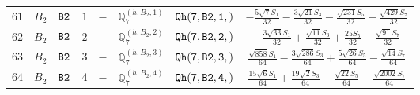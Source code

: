 \documentclass[fleqn,8pt]{jsarticle}
\begin{document}
\begin{table}[ht!]
\begin{center}
\begin{tabular}{cccccccc}
$ 61 $ & $ B_{2} $ & $ {\tt B2} $ & $ 1 $ & $ - $ & $ \mathbb{Q}_{7}^{(h,B_{2},1)} $ & $ {\tt Qh(7,B2,1,)} $ & $ - \frac{5 \sqrt{7} S_{1}}{32} - \frac{3 \sqrt{21} S_{3}}{32} - \frac{\sqrt{231} S_{5}}{32} - \frac{\sqrt{429} S_{7}}{32} $ \\
$ 62 $ & $ B_{2} $ & $ {\tt B2} $ & $ 2 $ & $ - $ & $ \mathbb{Q}_{7}^{(h,B_{2},2)} $ & $ {\tt Qh(7,B2,2,)} $ & $ - \frac{3 \sqrt{33} S_{1}}{32} + \frac{\sqrt{11} S_{3}}{32} + \frac{25 S_{5}}{32} - \frac{\sqrt{91} S_{7}}{32} $ \\
$ 63 $ & $ B_{2} $ & $ {\tt B2} $ & $ 3 $ & $ - $ & $ \mathbb{Q}_{7}^{(h,B_{2},3)} $ & $ {\tt Qh(7,B2,3,)} $ & $ \frac{\sqrt{858} S_{1}}{64} - \frac{3 \sqrt{286} S_{3}}{64} + \frac{5 \sqrt{26} S_{5}}{64} - \frac{\sqrt{14} S_{7}}{64} $ \\
$ 64 $ & $ B_{2} $ & $ {\tt B2} $ & $ 4 $ & $ - $ & $ \mathbb{Q}_{7}^{(h,B_{2},4)} $ & $ {\tt Qh(7,B2,4,)} $ & $ \frac{15 \sqrt{6} S_{1}}{64} + \frac{19 \sqrt{2} S_{3}}{64} + \frac{\sqrt{22} S_{5}}{64} - \frac{\sqrt{2002} S_{7}}{64} $ \\
 \hline \hline
\end{tabular}
\end{center}
\end{table}
\end{document}
